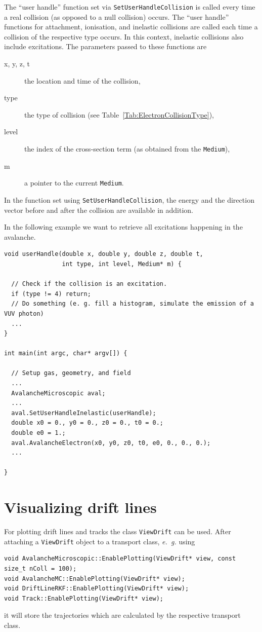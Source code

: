 The ``user handle'' function set via \texttt{SetUserHandleCollision} 
is called every time a real collision (as opposed to a null collision) occurs.
The ``user handle'' functions for attachment, ionisation, and inelastic collisions 
are called each time a collision of the respective type occurs.  
In this context, inelastic collisions also include excitations. 
The parameters passed to these functions are 
\begin{description}
  \item[x, y, z, t]
  the location and time of the collision, 
  \item[type]
  the type of collision (see Table~\ref{Tab:ElectronCollisionType}), 
  \item[level]
  the index of the cross-section term (as obtained from the \texttt{Medium}),
  \item[m]
   a pointer to the current \texttt{Medium}. 
\end{description}
In the function set using \texttt{SetUserHandleCollision}, the energy 
and the direction vector before and after the collision are available 
in addition. 

In the following example we want to retrieve  
all excitations happening in the avalanche.
\begin{lstlisting}
void userHandle(double x, double y, double z, double t,
                int type, int level, Medium* m) {

  // Check if the collision is an excitation.
  if (type != 4) return;
  // Do something (e. g. fill a histogram, simulate the emission of a VUV photon) 
  ...
} 

int main(int argc, char* argv[]) {

  // Setup gas, geometry, and field
  ...
  AvalancheMicroscopic aval;
  ...
  aval.SetUserHandleInelastic(userHandle);
  double x0 = 0., y0 = 0., z0 = 0., t0 = 0.;
  double e0 = 1.;
  aval.AvalancheElectron(x0, y0, z0, t0, e0, 0., 0., 0.); 
  ...

}

\end{lstlisting}
 
\section{Visualizing drift lines}

For plotting drift lines and tracks the class \texttt{ViewDrift} can be used. 
After attaching a \texttt{ViewDrift} object to a transport class, 
\textit{e.~g.} using
\begin{lstlisting}
void AvalancheMicroscopic::EnablePlotting(ViewDrift* view, const size_t nColl = 100);
void AvalancheMC::EnablePlotting(ViewDrift* view);
void DriftLineRKF::EnablePlotting(ViewDrift* view);
void Track::EnablePlotting(ViewDrift* view);
\end{lstlisting}
it will store the trajectories which are calculated by the respective 
transport class.
 
